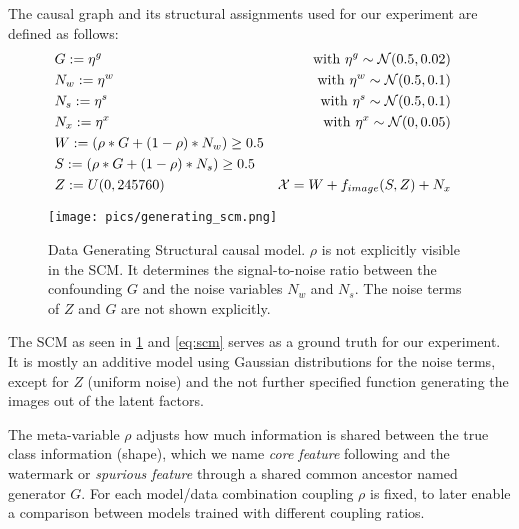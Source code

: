 The causal graph and its structural assignments used for our experiment are defined as follows: 
\begin{align}
&G:=\eta^g &\mathrm{with} \  \eta^g \sim \mathcal{N}(0.5,0.02) && \notag \\ 
&N_w:=\eta^w &\mathrm{with} \  \eta^w \sim \mathcal{N}(0.5,0.1) && \notag \\ 
&N_s:=\eta^s &\mathrm{with} \  \eta^s \sim \mathcal{N}(0.5,0.1) && \notag \\ 
&N_x:=\eta^x &\mathrm{with} \  \eta^x \sim \mathcal{N}(0,0.05) && \notag \\ 
&W:=(\rho * G + (1-\rho)* N_w) \geq 0.5 \notag \\ 
&S:=(\rho * G + (1-\rho)* N_s) \geq 0.5 \notag \\ 
&Z:= U(0,245760)
& \mathcal{X} = W + f_{image}(S, Z) + N_{x} &
\end{align}

\begin{figure}[H]
    \centering
    \texttt{[image: pics/generating\_scm.png]}
    \caption[Data Generating SCM]{Data Generating Structural causal model.
        $\rho$ is not explicitly visible in the SCM. It determines the signal-to-noise ratio between the confounding $G$ and the noise variables $N_w$ and $N_s$. The noise terms of $Z$ and $G$ are not shown explicitly.}
    \label{fig:generating_scm}
\end{figure}

The SCM as seen in \cref{fig:generating_scm} and \cref{eq:scm} serves as a ground truth for our experiment. It is mostly an additive model using Gaussian distributions for the noise terms, except for $Z$ (uniform noise) and the not further specified function generating the images out of the latent factors.

The meta-variable $\rho$ adjusts how much information is shared between the true class information (shape), which we name \textit{core feature} following \cite{Singla2022} and the watermark or \textit{spurious feature} through a shared common ancestor named generator $G$. For each model/data combination coupling $\rho$ is fixed, to later enable a comparison between models trained with different coupling ratios. \\

